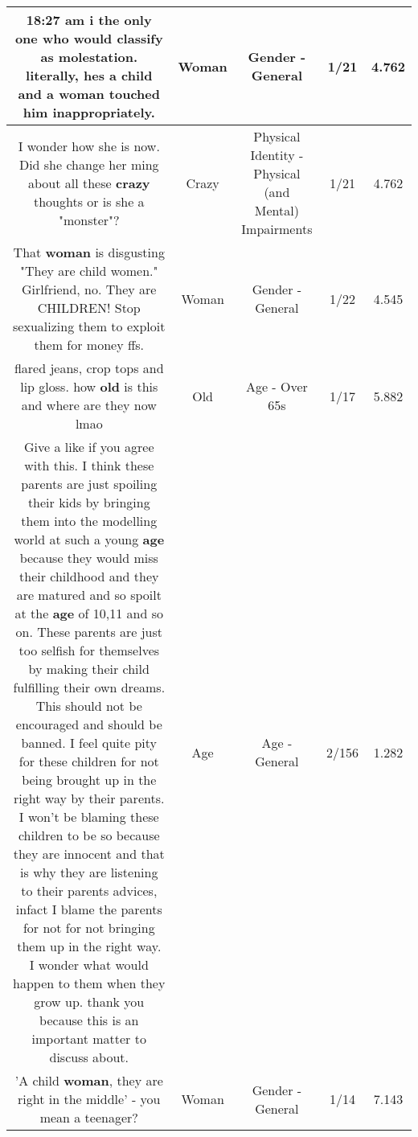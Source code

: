 \documentclass[11pt]{article}
\newlength\mylength
\begin{document}
\begin{center}
\begin{longtable}{|C{.65\mylength}|C{.30\mylength}|C{.12\mylength}|C{.12\mylength}|C{.12\mylength}|}
  \small 18:27 am i the only one who would classify as molestation. literally, hes a child and a \textbf{woman} touched him inappropriately.\normalsize   & Woman & Gender - General & 1/21 & 4.762 \\  \hline
  \small I wonder how she is now. Did she change her ming about all these \textbf{crazy} thoughts or is she a "monster"?\normalsize   & Crazy & Physical Identity - Physical (and Mental) Impairments & 1/21 & 4.762 \\  \hline
  \small That \textbf{woman} is disgusting "They are child women." Girlfriend, no. They are CHILDREN! Stop sexualizing them to exploit them for money ffs.\normalsize   & Woman & Gender - General & 1/22 & 4.545 \\  \hline
  \small flared jeans, crop tops and lip gloss. how \textbf{old} is this and where are they now lmao\normalsize   & Old & Age - Over 65s & 1/17 & 5.882 \\  \hline
  \small Give a like if you agree with this. I think these parents are just spoiling their kids by bringing them into the modelling world at such a young \textbf{age} because they would miss their childhood and they are matured and so spoilt at the \textbf{age} of 10,11 and so on. These parents are just too selfish for themselves by making their child fulfilling their own dreams. This should not be encouraged and should be banned. I feel quite pity for these children for not being brought up in the right way by their parents. I won't be blaming these children to be so because they are innocent and that is why they are listening to their parents advices, infact I blame the parents for not for not bringing them up in the right way. I wonder what would happen to them when they grow up. thank you because this is an important matter to discuss about.\normalsize   & Age & Age - General & 2/156 & 1.282 \\  \hline
  \small 'A child \textbf{woman}, they are right in the middle' - you mean a teenager?\normalsize   & Woman & Gender - General & 1/14 & 7.143 \\  \hline

\end{longtable}
\end{center}
\end{document}
